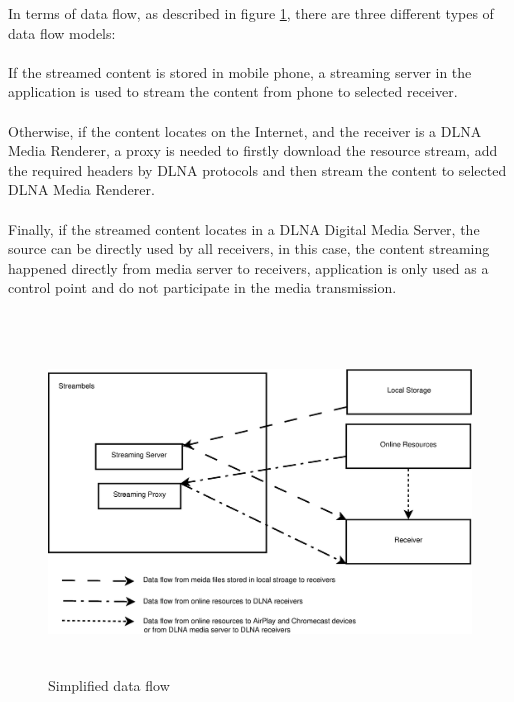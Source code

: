 In terms of data flow, as described in figure \ref{chart4}, there are three
different types of data flow models:\\
\\ 
If the streamed content is stored in mobile phone, a streaming server in the
application is used to stream the content from phone to selected receiver.\\
\\
Otherwise, if the content locates on the Internet, and the receiver is a DLNA
Media Renderer, a proxy is needed to firstly download the resource stream, add
the required headers by DLNA protocols and then stream the content to selected
DLNA Media Renderer.\\
\\
Finally, if the streamed content locates in a DLNA Digital Media Server, the
source can be directly used by all receivers, in this case, the content
streaming happened directly from media server to receivers, application is only
used as a control point and do not participate in the media transmission.\\
\\
\begin{figure}[htb]
\centering \includegraphics[height=9cm]{charts/data_flow}
\caption{Simplified data flow \label{chart4}}
\end{figure}

